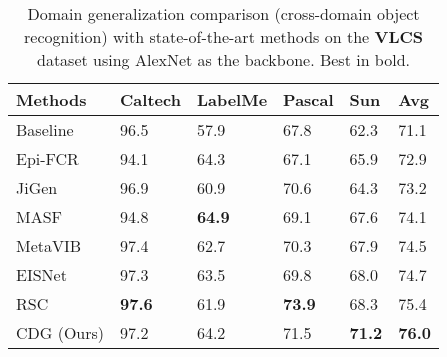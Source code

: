 \begin{table*}[htb]
  \caption{Domain generalization comparison (cross-domain object recognition) with state-of-the-art methods on the \textbf{VLCS} dataset using AlexNet as the backbone. Best in bold.}
  \label{tab:vlcs}
  \begin{center}
    \begin{tabularx}{0.8\textwidth}{p{}<{\centering}|p{}<{\centering}|p{}<{\centering}|p{}<{\centering}|p{}<{\centering}|X<{\centering}}

      \toprule[0.6pt]
      Methods                         & Caltech       & LabelMe       & Pascal        & Sun           & Avg           \\
      \midrule[0.4pt]
      Baseline                         & 96.5          & 57.9          & 67.8          & 62.3          & 71.1          \\
      Epi-FCR \citep{li2019episodic}   & 94.1          & 64.3          & 67.1          & 65.9          & 72.9          \\
      JiGen \citep{carlucci2019domain} & 96.9          & 60.9          & 70.6          & 64.3          & 73.2          \\
      MASF \citep{dou2019domain}       & 94.8          & \textbf{64.9} & 69.1          & 67.6          & 74.1          \\
      MetaVIB \citep{du2020learning}   & 97.4          & 62.7          & 70.3          & 67.9          & 74.5          \\
      EISNet \citep{wang2020learning}  & 97.3          & 63.5          & 69.8          & 68.0          & 74.7          \\
      RSC \citep{huangRSC2020}         & \textbf{97.6} & 61.9          & \textbf{73.9} & 68.3          & 75.4          \\

      CDG (Ours)                      & 97.2          & 64.2          & 71.5          & \textbf{71.2} & \textbf{76.0} \\
      \bottomrule[0.6pt]
    \end{tabularx}
  \end{center}
\end{table*}
